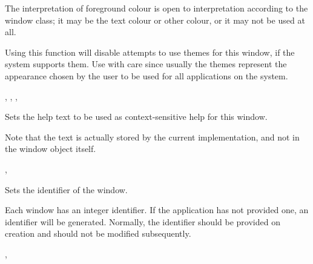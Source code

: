


The interpretation of foreground colour is open to interpretation according
to the window class; it may be the text colour or other colour, or it may not
be used at all.

Using this function will disable attempts to use themes for this
window, if the system supports them.  Use with care since usually the
themes represent the appearance chosen by the user to be used for all
applications on the system.


,\rtfsp
{},\rtfsp
{},\rtfsp
{}


\label{wxwindowsethelptext}


Sets the help text to be used as context-sensitive help for this window.

Note that the text is actually stored by the current  implementation,
and not in the window object itself.


, 


\label{wxwindowsetid}


Sets the identifier of the window.


Each window has an integer identifier. If the application has not provided one,
an identifier will be generated. Normally, the identifier should be provided
on creation and should not be modified subsequently.


,\rtfsp
{}




